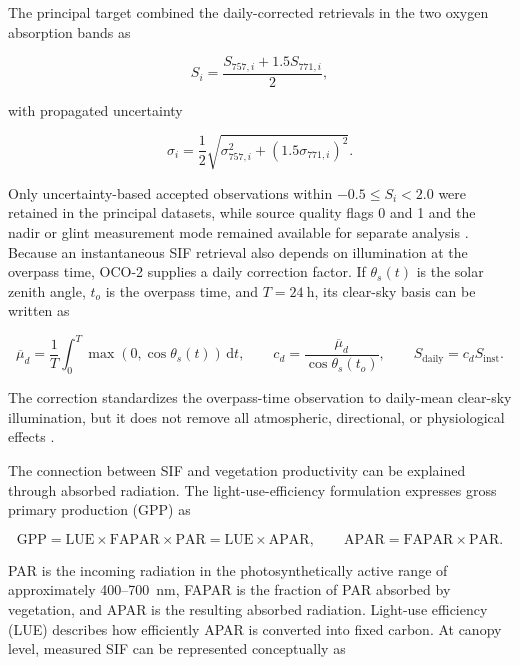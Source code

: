 The principal target combined the daily-corrected retrievals in the two oxygen absorption bands as

\begin{equation}
S_i=\frac{S_{757,i}+1.5S_{771,i}}{2},
\label{eq:background_combined_sif}
\end{equation}

with propagated uncertainty

\begin{equation}
\sigma_i=\frac{1}{2}\sqrt{\sigma_{757,i}^{2}+\left(1.5\sigma_{771,i}\right)^{2}}.
\label{eq:background_combined_sif_uncertainty}
\end{equation}

Only uncertainty-based accepted observations within \(-0.5\leq S_i<2.0\) were retained in the principal datasets, while source quality flags 0 and 1 and the nadir or glint measurement mode remained available for separate analysis \cite{oco2_sif_v11r,oco2_sif_v112r}. Because an instantaneous SIF retrieval also depends on illumination at the overpass time, OCO-2 supplies a daily correction factor. If \(\theta_s(t)\) is the solar zenith angle, \(t_o\) is the overpass time, and \(T=24~\mathrm{h}\), its clear-sky basis can be written as

\begin{equation}
\overline{\mu}_{d}=\frac{1}{T}\int_{0}^{T}\max\!\left(0,\cos\theta_s(t)\right)\,\mathrm{d}t,
\qquad
c_{d}=\frac{\overline{\mu}_{d}}{\cos\theta_s(t_o)},
\qquad
S_{\mathrm{daily}}=c_{d}S_{\mathrm{inst}}.
\label{eq:daily_sif_correction}
\end{equation}

The correction standardizes the overpass-time observation to daily-mean clear-sky illumination, but it does not remove all atmospheric, directional, or physiological effects \cite{doughty2022global,chen2020upscaling}.

The connection between SIF and vegetation productivity can be explained through absorbed radiation. The light-use-efficiency formulation expresses gross primary production (GPP) as \cite{monteith1972solar,monteith1977climate,liu2020estimating}

\begin{equation}
\mathrm{GPP}=\mathrm{LUE}\times\mathrm{FAPAR}\times\mathrm{PAR}
=\mathrm{LUE}\times\mathrm{APAR},
\qquad
\mathrm{APAR}=\mathrm{FAPAR}\times\mathrm{PAR}.
\label{eq:gpp_lue_background}
\end{equation}

PAR is the incoming radiation in the photosynthetically active range of approximately 400--700~nm, FAPAR is the fraction of PAR absorbed by vegetation, and APAR is the resulting absorbed radiation. Light-use efficiency (LUE) describes how efficiently APAR is converted into fixed carbon. At canopy level, measured SIF can be represented conceptually as \cite{berry2013new,porcar2014linking,liu2020estimating}

